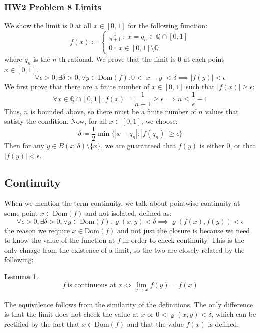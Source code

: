 \documentclass[10pt,letterpaper]{article} %
\newtheorem{lem}{Lemma}[section]
\begin{document}
\subsubsection{HW2 Problem 8 Limits}
We show the limit is $0$ at all $x \in [0, 1]$ for the following function:
\begin{equation*}
f(x) \coloneq \begin{cases*}
  \frac{1}{n+1} \ : \ x = q_n \in \mathbb{Q} \cap [0, 1]\\
  0 \ : \ x \in [0, 1] \setminus \mathbb{Q}
\end{cases*}
\end{equation*}
where $q_n$ is the $n$-th rational. We prove that the limit is $0$ at each point $x \in [0, 1]$. 
\begin{equation*}
\forall \epsilon > 0, \exists \delta > 0, \forall y \in \text{Dom}(f): 0 < |x-y| < \delta \implies |f(y)| < \epsilon
\end{equation*}
We first prove that there are a finite number of $x \in [0, 1]$ such that $|f(x)| \geqslant \epsilon$:
\begin{equation*}
  \forall x \in \mathbb{Q} \cap [0, 1]: f(x) = \frac{1}{n+1} \geqslant \epsilon \implies n \leqslant \frac{1}{\epsilon} - 1
\end{equation*}
Thus, $n$ is bounded above, so there must be a finite number of $n$ values that satisfy the condition. Now, for all $x \in [0, 1]$, we choose:
\begin{equation*}
  \delta \coloneq \frac{1}{2}\min\{|x - q_n| : |f(q_n)| \geqslant \epsilon\}
\end{equation*}
Then for any $y \in B(x, \delta)\setminus \{x\}$, we are guaranteed that $f(y)$ is either $0$, or that $|f(y)| < \epsilon$.

\subsection{Continuity}
When we mention the term continuity, we talk about pointwise continuity at some point $x \in \text{Dom}(f)$ and not isolated, defined as:
\begin{equation*}
\forall \epsilon > 0, \exists \delta > 0, \forall y \in \text{Dom}(f): \varrho(x, y) < \delta \implies \varrho(f(x), f(y)) < \epsilon
\end{equation*}
the reason we require $x \in \text{Dom}(f)$ and not just the closure is because we need to know the value of the function at $f$ in order to check continuity. This is the only chnage from the existence of a limit, so the two are closely related by the following:
\begin{lem}
\begin{equation*}
f \ \text{is continuous at } x \iff \lim_{y \xrightarrow{} x} f(y) = f(x)
\end{equation*}
\end{lem}
The equivalence follows from the similarity of the definitions. The only difference is that the limit does not check the value at $x$ or $0 < \varrho(x, y) < \delta$, which can be rectified by the fact that $x \in \text{Dom}(f)$ and that the value $f(x)$ is defined.\\
\end{document}
